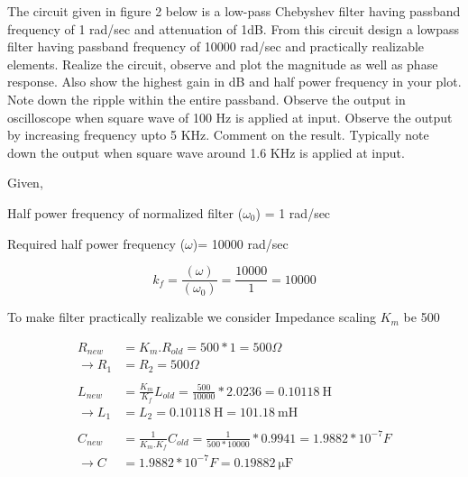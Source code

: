 \documentclass[a4paper,11pt]{article}
\begin{document}
\begin{Q}
    {
        The circuit given in figure 2 below is a low-pass Chebyshev filter having passband frequency of 1
        rad/sec and attenuation of 1dB. From this circuit design a lowpass filter having passband
        frequency of 10000 rad/sec and practically realizable elements. Realize the circuit, observe and
        plot the magnitude as well as phase response. Also show the highest gain in dB and half power
        frequency in your plot. Note down the ripple within the entire passband.\newline
        Observe the output in oscilloscope when square wave of 100 Hz is applied at input. Observe the
        output by increasing frequency upto 5 KHz. Comment on the result.\newline
        Typically note down the output when square wave around 1.6 KHz is applied at input.
    }
\end{Q}



Given,

Half power frequency of normalized filter ($\omega_0$) = 1 rad/sec

Required half power frequency ($\omega$)= 10000 rad/sec


\begin{equation*}
    k_f= \frac{(\omega)}{(\omega_0)} = \frac{10000}{1} = 10000
\end{equation*}

To make filter practically realizable we consider Impedance scaling $K_m$ be 500

\begin{align*}
    R_{new}         & =K_m.R_{old}=500 *1=  500 \Omega                                        \\
    \rightarrow R_1 & =R_2=500 \Omega                                                         \\\\
    L_{new}         & =\frac{K_m}{K_f}L_{old}=\frac{500}{10000}*2.0236=\SI {0.10118} {\henry} \\
    \rightarrow L_1 & =L_2=\SI {0.10118} {\henry}=\SI {101.18} {\milli\henry}                 \\\\
    C_{new}         & =\frac{1}{K_m.K_f}C_{old}=\frac{1}{500*10000}*0.9941=1.9882*10^{-7} F   \\
    \rightarrow C   & =1.9882*10^{-7} F=\SI{0.19882}{\micro \farad}                           \\
\end{align*}
\end{document}
